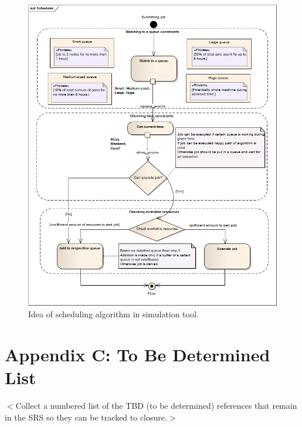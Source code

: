 \documentclass{report}
\begin{document}
	\begin{figure}[!hbtp]
		\centering
		\includegraphics[width=\textwidth, angle=0, scale=1.0]{../ea_files/generatedImages/Simulator/Scheduler.png}
		\caption{Idea of scheduling algorithm in simulation tool.}
		\label{app:st:scheduer}
	\end{figure}
\section{Appendix C: To Be Determined List}
$<$Collect a numbered list of the TBD (to be determined) references that remain 
in the SRS so they can be tracked to closure.$>$
\end{document}
